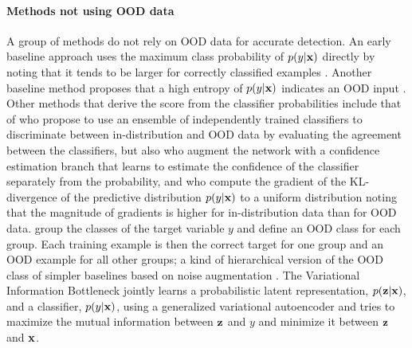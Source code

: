 \paragraph{Methods not using OOD data}
A group of methods do not rely on OOD data for accurate detection. 
An early baseline approach uses the maximum class probability of $p(y|{\mathbf{x}})$ directly by noting that it tends to be larger for correctly classified examples \parencite{hendrycks_baseline_2017}. Another baseline method proposes that a high entropy of $p(y|{\mathbf{x}})$ indicates an OOD input \parencite{ren_likelihood_2019}. 
Other methods that derive the score from the classifier probabilities include that of \textcite{lakshminarayanan_simple_2017} who propose to use an ensemble of independently trained classifiers to discriminate between in-distribution and OOD data by evaluating the agreement between the classifiers, but also \textcite{devries_learning_2018} who augment the network with a confidence estimation branch that learns to estimate the confidence of the classifier separately from the probability, and \textcite{huang_importance_2021} who compute the gradient of the KL-divergence of the predictive distribution $p(y|{\mathbf{x}})$ to a uniform distribution noting that the magnitude of gradients is higher for in-distribution data than for OOD data. 
\textcite{huang_mos_2021} group the classes of the target variable $y$ and define an OOD class for each group. Each training example is then the correct target for one group and an OOD example for all other groups; a kind of hierarchical version of the OOD class of simpler baselines based on noise augmentation \parencite{ren_likelihood_2019}. 
The Variational Information Bottleneck \parencite{alemi_deep_2017} jointly learns a probabilistic latent representation, $p({\mathbf{z}}|{\mathbf{x}})$, and a classifier, $p(y|{\mathbf{x}})$, using a generalized variational autoencoder and tries to maximize the mutual information between ${\mathbf{z}}$ and $y$ and minimize it between ${\mathbf{z}}$ and ${\mathbf{x}}$.

